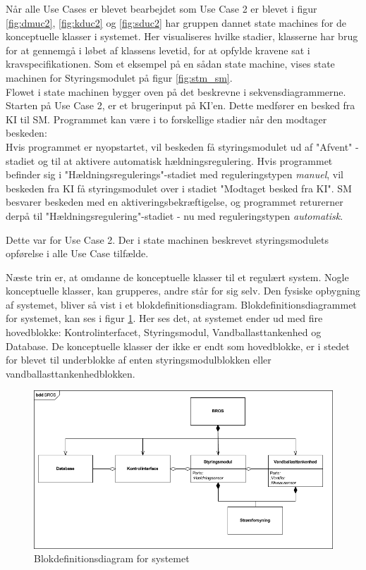 Når alle Use Cases er blevet bearbejdet som Use Case 2 er blevet i figur \ref{fig:dmuc2}, \ref{fig:kduc2} og \ref{fig:sduc2} har gruppen dannet state machines for de konceptuelle klasser i systemet. Her visualiseres hvilke stadier, klasserne har brug for at gennemgå i løbet af klassens levetid, for at opfylde kravene sat i kravspecifikationen. Som et eksempel på en sådan state machine, vises state machinen for Styringsmodulet på figur \ref{fig:stm_sm}. \\Flowet i state machinen bygger oven på det beskrevne i sekvensdiagrammerne. Starten på Use Case 2, er et brugerinput på KI'en. Dette medfører en besked fra KI til SM. Programmet kan være i to forskellige stadier når den modtager beskeden:\\
Hvis programmet er nyopstartet, vil beskeden få styringsmodulet ud af "Afvent" -stadiet og til at aktivere automatisk hældningsregulering. Hvis programmet befinder sig i "Hældningsregulerings"-stadiet med reguleringstypen \textit{manuel}, vil beskeden fra KI få styringsmodulet over i stadiet "Modtaget besked fra KI". SM besvarer beskeden med en aktiveringsbekræftigelse, og programmet returerner derpå til "Hældningsregulering"-stadiet - nu med reguleringstypen \textit{automatisk}.

Dette var for Use Case 2. Der i state machinen beskrevet styringsmodulets opførelse i alle Use Case tilfælde. 

Næste trin er, at omdanne de konceptuelle klasser til et regulært system. Nogle konceptuelle klasser, kan grupperes, andre står for sig selv. Den fysiske opbygning af systemet, bliver så vist i et blokdefinitionsdiagram. Blokdefinitionsdiagrammet for 
systemet, kan ses i figur \ref{fig:bdd_bros}. Her ses det, at systemet ender ud med fire hovedblokke: Kontrolinterfacet, Styringsmodul, Vandballasttankenhed og Database. De konceptuelle klasser der ikke er endt som hovedblokke, er i stedet for blevet til underblokke af enten styringsmodulblokken eller vandballasttankenhedblokken.

\begin{figure}[htbp]
\centering
\includegraphics[scale=0.5]{billeder/Systemarkitektur/bdd_bros}
\caption{Blokdefinitionsdiagram for systemet}
\label{fig:bdd_bros}
\end{figure}

